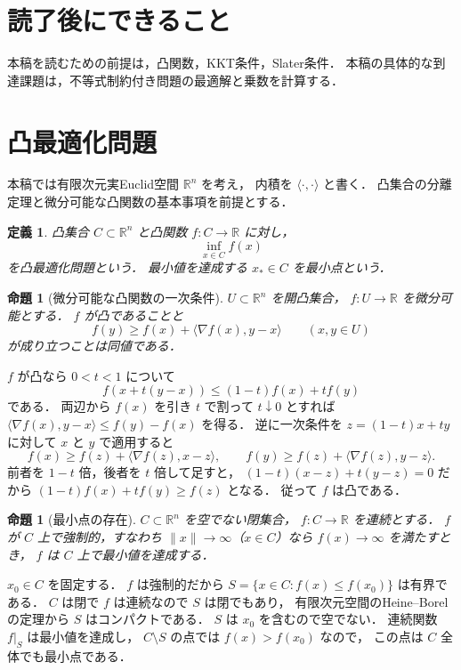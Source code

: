 \documentclass[a5paper,10pt,onecolumn]{jsarticle}
\makeatletter
\theoremstyle{mathnotetheorem}
\newtheorem{definition}[theorem]{定義}
\newtheorem{proposition}[theorem]{命題}
\renewcommand{\proofname}{証明}
\renewenvironment{proof}[1][\proofname]{%
  \par\pushQED{\qed}\normalfont\topsep4\p@\@plus2\p@\relax
  \trivlist\item[\hskip\labelsep\bfseries #1]\ignorespaces
}{\popQED\endtrivlist\@endpefalse}
\newcommand{\norm}[1]{\lVert #1\rVert}
\makeatother
\begin{document}
\section*{読了後にできること}
本稿を読むための前提は，凸関数，KKT条件，Slater条件．
本稿の具体的な到達課題は，不等式制約付き問題の最適解と乗数を計算する．


\section{凸最適化問題}

本稿では有限次元実Euclid空間 $\mathbb R^n$ を考え，
内積を $\langle\cdot,\cdot\rangle$ と書く．
凸集合の分離定理と微分可能な凸関数の基本事項を前提とする．

\begin{definition}
凸集合 $C\subset\mathbb R^n$ と凸関数
$f:C\to\mathbb R$ に対し，
\[
 \inf_{x\in C}f(x)
\]
を\emph{凸最適化問題}という．
最小値を達成する $x_*\in C$ を\emph{最小点}という．
\end{definition}

\begin{proposition}[微分可能な凸関数の一次条件]\label{prop:first-order}
$U\subset\mathbb R^n$ を開凸集合，
$f:U\to\mathbb R$ を微分可能とする．
$f$ が凸であることと
\[
 f(y)\ge f(x)+\langle\nabla f(x),y-x\rangle
 \qquad(x,y\in U)
\]
が成り立つことは同値である．
\end{proposition}
\begin{proof}
$f$ が凸なら $0<t<1$ について
\[
 f(x+t(y-x))\le(1-t)f(x)+tf(y)
\]
である．
両辺から $f(x)$ を引き $t$ で割って
$t\downarrow0$ とすれば
$\langle\nabla f(x),y-x\rangle\le f(y)-f(x)$ を得る．
逆に一次条件を $z=(1-t)x+ty$ に対して
$x$ と $y$ で適用すると
\[
 f(x)\ge f(z)+\langle\nabla f(z),x-z\rangle,\qquad
 f(y)\ge f(z)+\langle\nabla f(z),y-z\rangle.
\]
前者を $1-t$ 倍，後者を $t$ 倍して足すと，
$(1-t)(x-z)+t(y-z)=0$ だから
$(1-t)f(x)+tf(y)\ge f(z)$ となる．
従って $f$ は凸である．
\end{proof}

\begin{proposition}[最小点の存在]\label{prop:existence}
$C\subset\mathbb R^n$ を空でない閉集合，
$f:C\to\mathbb R$ を連続とする．
$f$ が $C$ 上で強制的，すなわち
$\norm x\to\infty$（$x\in C$）なら
$f(x)\to\infty$ を満たすとき，
$f$ は $C$ 上で最小値を達成する．
\end{proposition}
\begin{proof}
$x_0\in C$ を固定する．
$f$ は強制的だから
$S=\{x\in C:f(x)\le f(x_0)\}$ は有界である．
$C$ は閉で $f$ は連続なので $S$ は閉でもあり，
有限次元空間のHeine--Borelの定理から
$S$ はコンパクトである．
$S$ は $x_0$ を含むので空でない．
連続関数 $f|_S$ は最小値を達成し，
$C\setminus S$ の点では $f(x)>f(x_0)$ なので，
この点は $C$ 全体でも最小点である．
\end{proof}
\end{document}
